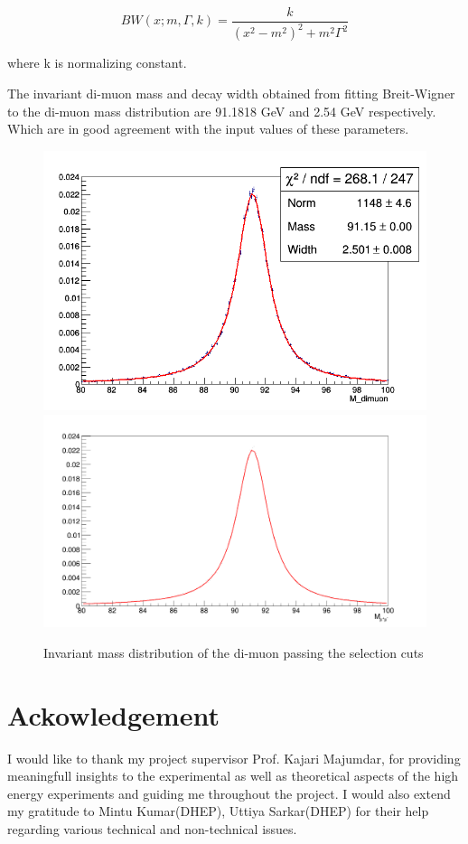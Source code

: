 \documentclass{article}		%
\begin{document}
	$$BW(x;m,\Gamma,k) = \frac{k}{(x^2 - m^2)^2 + m^2 \Gamma^2}$$	 

where k is normalizing constant.
 
The invariant di-muon mass and decay width obtained from fitting Breit-Wigner to the di-muon mass distribution are 91.1818 GeV and 2.54 GeV respectively. Which are in good agreement with the input values of these parameters.	

\begin{figure}[h]
	\begin{center}
		\includegraphics[scale=0.4]{m.png} 
		\includegraphics[scale=0.15]{mass.png} 	
		\caption{Invariant mass distribution of the di-muon passing the selection cuts} 					
	\end{center}
	\centering	
\end{figure}

\section{Ackowledgement}
	I would like to thank my project supervisor Prof. Kajari Majumdar, for providing meaningfull insights to the experimental as well as theoretical aspects of the high energy experiments and guiding me throughout the project. I would also extend my gratitude to Mintu Kumar(DHEP), Uttiya Sarkar(DHEP) for their help regarding various technical and non-technical issues.  
	
\end{document}

